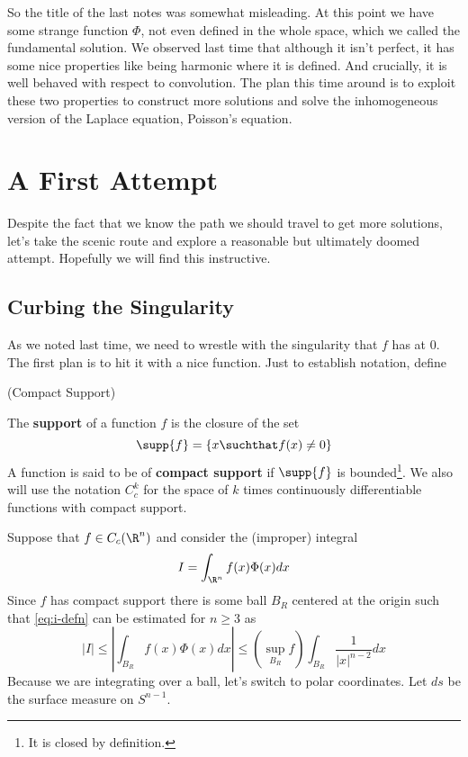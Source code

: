 \documentclass{bkcnotes}
\begin{document}
\maketitle

So the title of the last notes was somewhat misleading. At this point
we have some strange function $\Phi$, not even defined in the whole
space, which we called the fundamental solution. We observed last time
that although it isn't perfect, it has some nice properties like being
harmonic where it is defined. And crucially, it is well behaved with
respect to convolution. The plan this time around is to exploit these
two properties to construct more solutions and solve the inhomogeneous
version of the Laplace equation, Poisson's equation.

\section{A First Attempt}
Despite the fact that we know the path we should travel to get more
solutions, let's take the scenic route and explore a reasonable but
ultimately doomed attempt. Hopefully we will find this instructive.

\subsection{Curbing the Singularity}
As we noted last time, we need to wrestle with the singularity that
$f$ has at 0. The first plan is to hit it with a nice function. Just
to establish notation, define
\begin{ndefn}(Compact Support)

  The \textbf{support} of a function $f$ is the closure of the set
  \begin{equation}
    \label{eq:support}
    \supp{f} = \{x \suchthat f(x) \neq 0\}
  \end{equation}
  A function is said to be of \textbf{compact support} if $\supp{f}$
  is bounded\footnote{It is closed by definition.}. We also will use
  the notation $C^k_c$ for the space of $k$ times continuously
  differentiable functions with compact support.
\end{ndefn}
Suppose that $f \in C_c(\R^n)$ and consider the (improper) integral
\begin{equation}
  \label{eq:i-defn}
  I = \int_{\R^n} f(x)\Phi(x)dx
\end{equation}
Since $f$ has compact support there is some ball $B_R$ centered at the
origin such that \eqref{eq:i-defn} can be estimated for $n \geq 3$ as
\begin{equation}
  \label{eq:i-estimate}
  |I| \leq \left| \int_{B_R}f(x)\Phi(x)dx\right|
  \leq (\sup_{B_R} f)\int_{B_R}\frac{1}{|x|^{n-2}}dx
\end{equation}
Because we are integrating over a ball, let's switch to polar
coordinates. Let $ds$ be the surface measure on $S^{n-1}$. 
\end{document}
